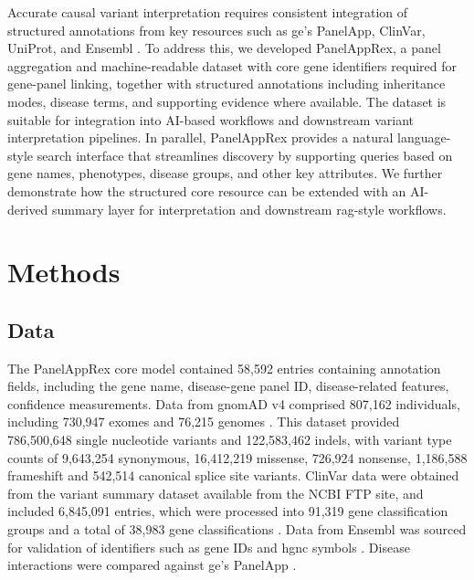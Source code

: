 Accurate causal variant interpretation requires consistent integration of structured annotations from key resources such as \ac{ge}’s PanelApp, ClinVar, UniProt, and Ensembl \cite{martin_panelapp_2019, landrum_clinvar_2018, the_uniprot_consortium_uniprot_2025, dyer_ensembl_2025}. 
To address this, we developed PanelAppRex, a panel aggregation and machine-readable dataset with core gene identifiers required for gene-panel linking, together with structured annotations including inheritance modes, disease terms, and supporting evidence where available.
The dataset is suitable for integration into AI-based workflows and downstream variant interpretation pipelines. 
In parallel, PanelAppRex provides a natural language-style search interface that streamlines discovery by supporting queries based on gene names, phenotypes, disease groups, and other key attributes. 
We further demonstrate how the structured core resource can be extended with an AI-derived summary layer for interpretation and downstream \ac{rag}-style workflows.

\section{Methods}

\subsection{Data}
The PanelAppRex core model contained 58,592 entries containing annotation fields, including the gene name, disease-gene panel ID, disease-related features, confidence measurements.
Data from gnomAD v4 comprised 807,162 individuals, including 730,947 exomes and 76,215 genomes \cite{karczewski2020mutational}. This dataset provided 786,500,648 single nucleotide variants and 122,583,462 indels, with variant type counts of 9,643,254 synonymous, 16,412,219 missense, 726,924 nonsense, 1,186,588 frameshift and 542,514 canonical splice site variants. ClinVar data were obtained from the variant summary dataset 
 available from the NCBI FTP site, and included 6,845,091 entries, which were processed into 91,319 gene classification groups and a total of 38,983 gene classifications 
\cite{landrum_clinvar_2018}. 
Data from Ensembl was sourced for validation of identifiers such as gene IDs and \ac{hgnc} symbols
\cite{dyer_ensembl_2025}.
Disease interactions were compared against \ac{ge}’s PanelApp
\cite{martin_panelapp_2019}.

